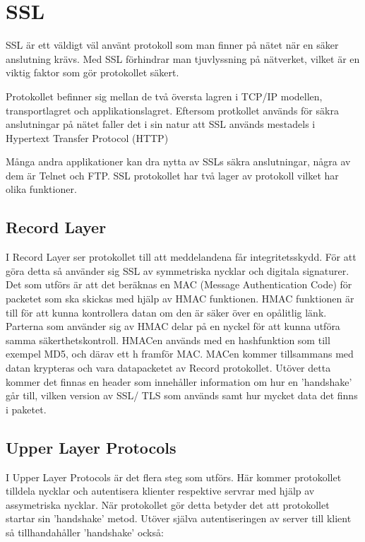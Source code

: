\section{SSL}
SSL är ett väldigt väl använt protokoll som man finner på nätet när en säker anslutning krävs. Med SSL förhindrar man tjuvlyssning på nätverket, vilket är en viktig faktor som gör protokollet säkert. 

Protokollet befinner sig mellan de två översta lagren i TCP/IP modellen, transportlagret och applikationslagret.
Eftersom protkollet används för säkra anslutningar på nätet faller det i sin natur att SSL används mestadels i Hypertext Transfer Protocol (HTTP) \cite{JSSE} 

Många andra applikationer kan dra nytta av SSLs säkra anslutningar, några av dem är Telnet och FTP. 
SSL protokollet har två lager av protokoll vilket har olika funktioner.

\subsection{Record Layer}
I Record Layer ser protokollet till att meddelandena får integritetsskydd. För att göra detta så använder sig SSL av symmetriska nycklar och digitala signaturer. Det som utförs är att det beräknas en MAC (Message Authentication Code) för packetet som ska skickas med hjälp av HMAC funktionen. HMAC funktionen är till för att kunna kontrollera datan om den är säker över en opålitlig länk. Parterna som använder sig av HMAC delar på en nyckel för att kunna utföra samma säkerthetskontroll. HMACen används med en hashfunktion som till exempel MD5, och därav ett h framför MAC. MACen kommer tillsammans med datan krypteras och vara datapacketet av Record protokollet. Utöver detta kommer det finnas en header som innehåller information om hur en 'handshake' går till, vilken version av SSL/ TLS som används samt hur mycket data det finns i paketet.

\subsection{Upper Layer Protocols}
I Upper Layer Protocols är det flera steg som utförs. Här kommer protokollet tilldela nycklar och autentisera klienter respektive servrar med hjälp av assymetriska nycklar. När protokollet gör detta betyder det att protokollet startar sin 'handshake' metod. Utöver själva autentiseringen av server till klient så tillhandahåller 'handshake' också:


